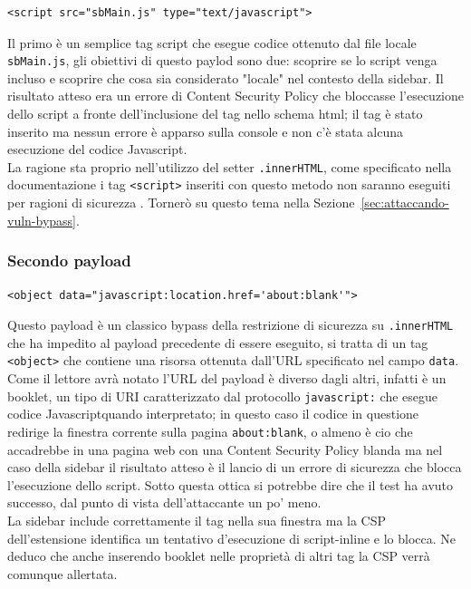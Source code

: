 \documentclass{sapthesis}
\newcommand{\code}[1]{\texttt{#1}}
\newcommand{\file}[1]{\code{#1}}
\newcommand{\attr}[1]{\code{.#1}}
\newcommand{\refSection}[1]{Sezione~\ref{#1}}
\newcommand{\JS}{Javascript}
\begin{document}
            \begin{lstlisting}[numbers=none]
            <script src="sbMain.js" type="text/javascript">
\end{lstlisting}
            Il primo è un semplice tag script che esegue codice ottenuto dal file locale \file{sbMain.js},
            gli obiettivi di questo paylod sono due: scoprire se lo script venga incluso e scoprire che 
            cosa sia considerato "locale" nel contesto della sidebar. Il risultato atteso era un errore
            di Content Security Policy che bloccasse l'esecuzione dello script a fronte dell'inclusione del
            tag nello schema html; il tag è stato inserito ma nessun errore è apparso sulla console e non
            c'è stata alcuna esecuzione del codice \JS.\\
            La ragione sta proprio nell'utilizzo del setter \attr{innerHTML}, come specificato nella
            documentazione i tag \code{<script>} inseriti con questo metodo non saranno eseguiti per
            ragioni di sicurezza \cite{innerHTML}. Tornerò su questo tema nella \refSection{sec:attaccando-vuln-bypass}.

        \subsubsection{Secondo payload}

            \begin{lstlisting}[numbers=none]
    <object data="javascript:location.href='about:blank'">
\end{lstlisting}
            Questo payload è un classico bypass della restrizione di sicurezza su \attr{innerHTML} che ha impedito al
            payload precedente di essere eseguito, si tratta di un tag \code{<object>} che contiene una risorsa
            ottenuta dall'URL specificato nel campo \code{data}. Come il lettore avrà notato l'URL del payload
            è diverso dagli altri, infatti è un booklet, un tipo di URI caratterizzato dal protocollo \code{javascript:}
            che esegue codice \JS quando interpretato; in questo caso il codice in questione redirige
            la finestra corrente sulla pagina \code{about:blank}, o almeno è cio che accadrebbe in una pagina web
            con una Content Security Policy blanda ma nel caso della sidebar il risultato atteso è il lancio
            di un errore di sicurezza che blocca l'esecuzione dello script. Sotto questa ottica si potrebbe dire che
            il test ha avuto successo, dal punto di vista dell'attaccante un po' meno.\\
            La sidebar include correttamente il tag nella sua finestra ma la CSP dell'estensione identifica un tentativo
            d'esecuzione di script-inline e lo blocca. Ne deduco che anche inserendo booklet nelle proprietà di
            altri tag la CSP verrà comunque allertata.
\end{document}
